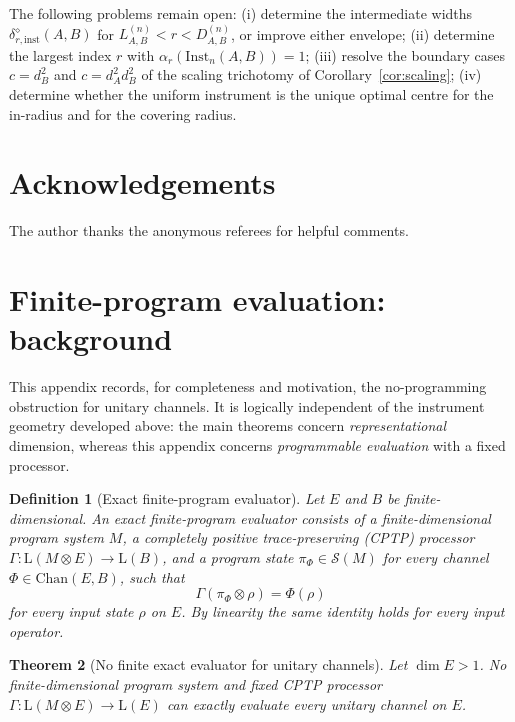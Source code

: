 \documentclass[11pt,a4paper]{article}
\newtheorem{theorem}{Theorem}[section]
\newtheorem{definition}[theorem]{Definition}
\newcommand{\Lin}{\mathrm{L}}
\newcommand{\Sstate}{\mathcal{S}}
\newcommand{\Chan}{\mathrm{Chan}}
\newcommand{\Inst}{\mathrm{Inst}}
\begin{document}
The following problems remain open: (i) determine the intermediate widths $\delta_{r,\mathrm{inst}}^{\diamond}(A,B)$ for $L_{A,B}^{(n)}<r<D_{A,B}^{(n)}$, or improve either envelope; (ii) determine the largest index $r$ with $\alpha_r(\Inst_n(A,B))=1$; (iii) resolve the boundary cases $c=d_B^2$ and $c=d_A^2d_B^2$ of the scaling trichotomy of Corollary~\ref{cor:scaling}; (iv) determine whether the uniform instrument is the unique optimal centre for the in-radius and for the covering radius.

\section*{Acknowledgements}
The author thanks the anonymous referees for helpful comments.

\appendix

\section{Finite-program evaluation: background}
\label{app:no-programming}

This appendix records, for completeness and motivation, the no-programming obstruction for unitary channels. It is logically independent of the instrument geometry developed above: the main theorems concern \emph{representational} dimension, whereas this appendix concerns \emph{programmable evaluation} with a fixed processor.

\begin{definition}[Exact finite-program evaluator]
Let $E$ and $B$ be finite-dimensional. An exact finite-program evaluator consists of a finite-dimensional program system $M$, a completely positive trace-preserving (CPTP) processor $\Gamma:\Lin(M\otimes E)\to\Lin(B)$, and a program state $\pi_\Phi\in\Sstate(M)$ for every channel $\Phi\in\Chan(E,B)$, such that
\[
\Gamma(\pi_\Phi\otimes\rho)=\Phi(\rho)
\]
for every input state $\rho$ on $E$. By linearity the same identity holds for every input operator.
\end{definition}

\begin{theorem}[No finite exact evaluator for unitary channels]
\label{thm:no-programming}
Let $\dim E>1$. No finite-dimensional program system and fixed CPTP processor $\Gamma:\Lin(M\otimes E)\to\Lin(E)$ can exactly evaluate every unitary channel on $E$.
\end{theorem}
\end{document}
